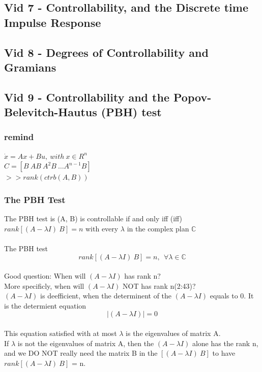 \documentclass{article}
\begin{document}
\subsection{Vid 7 - Controllability, and the Discrete time Impulse Response }
\subsection{Vid 8 - Degrees of Controllability and Gramians }
\subsection{Vid 9 - Controllability and the Popov-Belevitch-Hautus (PBH) test}

	\subsubsection{remind}
		$\dot{x} = Ax + Bu, ~with~ x\in R^n$ \\
		$C = [B ~ AB ~ A^{2}B ~ \ldots A^{n-1}B]$\\
		$>> rank(ctrb(A,B))$\\

	\subsubsection{The PBH Test}
		The PBH test is (A, B) is controllable if and only iff (iff)
		$rank[(A - \lambda I) ~B] = n$ with every $\lambda$ in the complex plan $\mathbb{C} $ \\
		\\The PBH test
		\begin{equation}
			rank[(A - \lambda I) ~B] = n,~~\forall \lambda \in \mathbb{C}
		\end{equation}
		\\Good question: When will $(A - \lambda I)$ has rank n?
		\\More specificly, when will $(A - \lambda I)$ NOT has rank n(2:43)?
		\\$(A - \lambda I)$ is deefficient, when the determinent of the $(A - \lambda I)$ equals to 0.
		It is the determient equation \begin{equation}  |(A - \lambda I)| = 0 \end{equation}
		\\This equation satisfied with at most $\lambda$ is the eigenvalues of matrix A.
		\\If $\lambda$ is not the eigenvalues of matrix A, then the $(A - \lambda I)$ alone has the rank n,
		and we DO NOT really need the matrix B in the $[(A - \lambda I) ~B]$ to have $rank[(A - \lambda I) ~B]$ = n.\\
\end{document}
